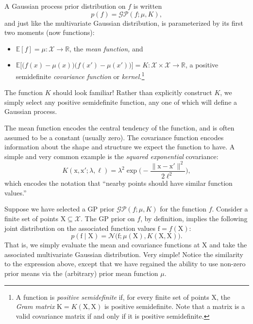 \documentclass{article}
\newcommand{\given}{\mid}
\newcommand{\mc}[1]{\mathcal{#1}}
\newcommand{\mat}[1]{\bm{\mathrm{#1}}}
\renewcommand{\vec}[1]{\bm{\mathrm{#1}}}
\newcommand{\R}{\mathbb{R}}
\newcommand{\Exp}{\mathbb{E}}
\begin{document}
A Gaussian process prior distribution on $f$ is written
\begin{equation*}
  p(f) = \mc{GP}(f; \mu, K),
\end{equation*}
and just like the multivariate Gaussian distribution, is
parameterized by its first two moments (now functions):
\begin{itemize}
\item $\Exp[f] = \mu\colon \mc{X} \to \R$, the \emph{mean function,} and
\item $\Exp\bigl[\bigl(f(x) - \mu(x)\bigr)\bigl(f(x') -
  \mu(x')\bigr)\bigr] = K\colon \mc{X} \times \mc{X} \to \R$, a
  positive semidefinite \emph{covariance function} or
  \emph{kernel.}\footnote{A function is \emph{positive semidefinite}
    if, for every finite set of points $\mat{X}$, the \emph{Gram
      matrix} $\mat{K} = K(\mat{X}, \mat{X})$ is positive
    semidefinite.  Note that a matrix is a valid covariance matrix if
    and only if it is positive semidefinite.}
\end{itemize}
The function $K$ should look familiar!  Rather than explicitly
construct $K$, we simply select any positive semidefinite function,
any one of which will define a Gaussian process.

The mean function encodes the central tendency of the function, and is
often assumed to be a constant (usually zero).  The covariance
function encodes information about the shape and structure we expect
the function to have.  A simple and very common example is the
\emph{squared exponential} covariance:
\begin{equation*}
  K(\vec{x}, \vec{x}'; \lambda, \ell)
  =
  \lambda^2
  \exp\biggl(-\frac{\lVert \vec{x} - \vec{x}' \rVert^2}{2\ell^2}\biggr),
\end{equation*}
which encodes the notation that ``nearby points should have similar
function values.''

Suppose we have selected a GP prior $\mc{GP}(f; \mu, K)$ for the
function $f$.  Consider a finite set of points $\mat{X} \subseteq
\mc{X}$.  The GP prior on $f$, by definition, implies the following
joint distribution on the associated function values $\vec{f} =
f(\mat{X})$:
\begin{equation*}
  p(\vec{f} \given \mat{X})
  =
  \mc{N}(\vec{f}; \mu(\mat{X}), K(\mat{X}, \mat{X})\bigr).
\end{equation*}
That is, we simply evaluate the mean and covariance functions at
$\mat{X}$ and take the associated multivariate Gaussian distribution.
Very simple!  Notice the similarity to the expression above, except
that we have regained the ability to use non-zero prior means via the
(arbitrary) prior mean function $\mu$.
\end{document}
